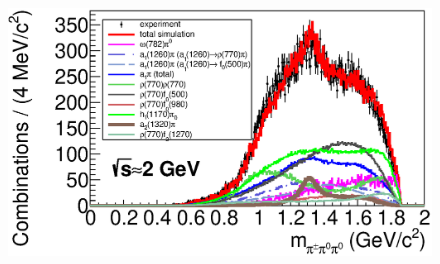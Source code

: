 \documentclass{beamer}
\begin{document}
\begin{frame}
\begin{minipage}[t]{0.49\linewidth}
\begin{figure}
    \end{figure}
  \end{minipage}
   \begin{minipage}[t]{0.49\linewidth}
    \begin{figure}
      \includegraphics[width=\linewidth]{figures/m_pipi0pi0_g1000_2pi2pi0.eps}
    \end{figure}
  \end{minipage}
\end{frame}
\end{document}
